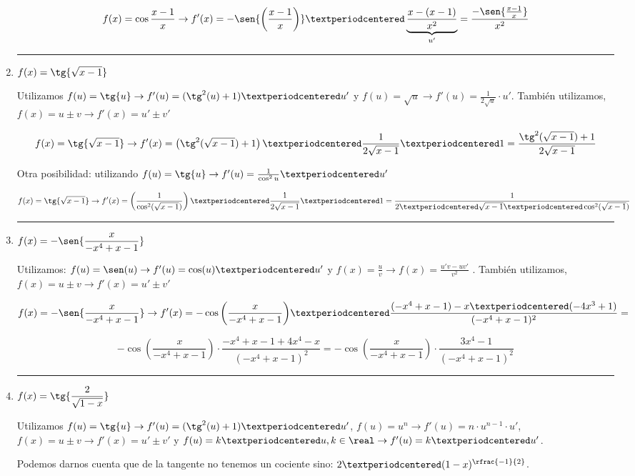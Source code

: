 \documentclass[palatino,nosec,nochap,nobuilddate]{Docencia}
\begin{document}
\begin{enumerate}
\[
	f(x) =  \cos{\frac{x-1}{x}} \to f'(x) = -\sen{\left(\frac{x-1}{x}\right)}·\underbrace{
	\frac{x-(x-1)}{x^2}}_{u'} = \frac{-\sen{\frac{x-1}{x}}}{x^2}
\]




\vspace{0.3cm}\hrule\vspace{0.6cm} \item $\displaystyle f(x) = \tg{\sqrt{x-1}} $

Utilizamos $f(u) = \tg{u} \to f'(u) = (\tg^2(u)+1)·u'$ y $f(u) = \sqrt{u} \to f'(u) = \frac{1}{2\sqrt{u}}·u'$.
 También utilizamos, $f(x) = u \pm v \to f'(x) = u' \pm v'$

\[
	f(x) = \tg{\sqrt{x-1}} \to f'(x) = \left(\tg^2(\sqrt{x-1})+1\right)·\frac{1}{2\sqrt{x-1}}·1 = \frac{\tg^2(\sqrt{x-1})+1}{2\sqrt{x-1}}
\]

Otra posibilidad: utilizando $f(u) = \tg{u} \to f'(u) = \frac{1}{\cos^2{u}}·u'$

\[
	f(x) = \tg{\sqrt{x-1}} \to f'(x) = \left(\frac{1}{\cos^2(\sqrt{x-1})}\right)·\frac{1}{2\sqrt{x-1}}·1 = \frac{1}{2·\sqrt{x-1}·\cos^2(\sqrt{x-1})}
\]

\vspace{0.3cm}\hrule\vspace{0.6cm} \item $\displaystyle f(x) = -\sen{\frac{x}{-x^4+x-1}} $

Utilizamos: $f(u) = \sen(u) \to f'(u) = \cos(u)·u'$ y $f(x) = \frac{u}{v} \to f(x) = \frac{u'v-uv'}{v^2}$
. También utilizamos, $f(x) = u \pm v \to f'(x) = u' \pm v'$

\[
	f(x) = -\sen{\frac{x}{-x^4+x-1}} \to f'(x) = -\cos{\left( \frac{x}{-x^4+x-1}\right)}·\frac{(-x^4+x-1)-x·(-4x^3+1)}{(-x^4+x-1)^2} =
	\]

\[ 	
 	-\cos{\left( \frac{x}{-x^4+x-1}\right)}·\frac{-x^4+x-1+4x^4-x}{(-x^4+x-1)^2} =
    -\cos{\left( \frac{x}{-x^4+x-1}\right)}·\frac{3x^4-1}{(-x^4+x-1)^2}
\]

\newpage
\vspace{0.3cm}\hrule\vspace{0.6cm} \item $\displaystyle f(x) = \tg{\frac{2}{\sqrt{1-x}}} $

Utilizamos $f(u) = \tg{u} \to f'(u) = (\tg^2(u)+1)·u'$, $f(u) = u^n \to f'(u) = n·u^{n-1}·u'$, $f(x) = u \pm v \to f'(x) = u' \pm v'$  y $f(u) = k·u, k\in\real \to f'(u) = k·u'$.

Podemos darnos cuenta que de la tangente no tenemos un cociente sino: $2·(1-x)^{\rfrac{-1}{2}}$.



\end{enumerate}
\end{document}
